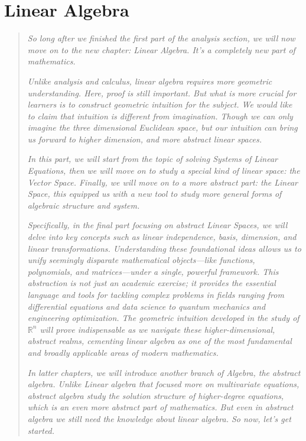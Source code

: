 \documentclass[oneside]{book}
\begin{document}
\chapter{Linear Algebra}
\begin{quote}
\emph{
So long after we finished the first part of the analysis section, we will now move on to the new chapter: Linear Algebra. It's a completely new part of mathematics.
}

\emph{
Unlike analysis and calculus, linear algebra requires more geometric understanding. Here, proof is still important. But what is more crucial for learners is to construct geometric intuition for the subject. We would like to claim that intuition is different from imagination. Though we can only imagine the three dimensional Euclidean space, but our intuition can bring us forward to higher dimension, and more abstract linear spaces.
}

\emph{
In this part, we will start from the topic of solving Systems of Linear Equations, then we will move on to study a special kind of linear space: the Vector Space. Finally, we will move on to a more abstract part: the Linear Space, this equipped us with a new tool to study more general forms of algebraic structure and system.
}

\emph{
Specifically, in the final part focusing on abstract Linear Spaces, we will delve into key concepts such as linear independence, basis, dimension, and linear transformations. Understanding these foundational ideas allows us to unify seemingly disparate mathematical objects—like functions, polynomials, and matrices—under a single, powerful framework. This abstraction is not just an academic exercise; it provides the essential language and tools for tackling complex problems in fields ranging from differential equations and data science to quantum mechanics and engineering optimization. The geometric intuition developed in the study of $\mathbb{R}^n$ will prove indispensable as we navigate these higher-dimensional, abstract realms, cementing linear algebra as one of the most fundamental and broadly applicable areas of modern mathematics.
}

\emph{
In latter chapters, we will introduce another branch of Algebra, the abstract algebra. Unlike Linear algebra that focused more on multivariate equations, abstract algebra study the solution structure of higher-degree equations, which is an even more abstract part of mathematics. But even in abstract algebra we still need the knowledge about linear algebra. So now, let's get started.
}
\end{quote}
\end{document}
